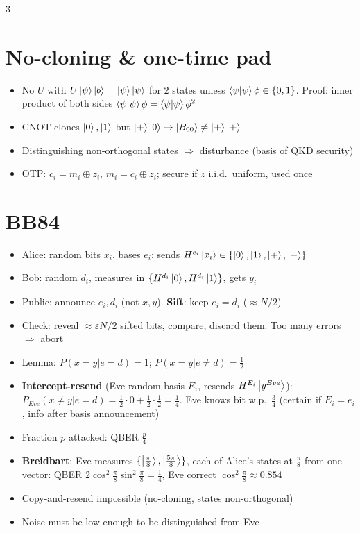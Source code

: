 \documentclass[10pt]{article}
\newcommand{\B}[1]{\ket{B_{#1}}}
\newcommand{\pp}{\ket{+}}
\newcommand{\mm}{\ket{-}}
\begin{document}
\begin{multicols*}{3}
\section{No-cloning \& one-time pad}
\begin{itemize}
  \item No $U$ with $U\ket\psi\ket{b}=\ket\psi\ket\psi$ for 2 states unless $\braket\psi\phi\in\{0,1\}$. Proof: inner product of both sides $\braket\psi\phi=\braket\psi\phi^2$
  \item CNOT clones $\ket0,\ket1$ but $\pp\ket0\mapsto\B{00}\neq\pp\pp$
  \item Distinguishing non-orthogonal states $\Rightarrow$ disturbance (basis of QKD security)
  \item OTP: $c_i=m_i\oplus z_i$, $m_i=c_i\oplus z_i$; secure if $z$ i.i.d.\ uniform, used once
\end{itemize}

\section{BB84}
\begin{itemize}
  \item Alice: random bits $x_i$, bases $e_i$; sends $H^{e_i}\ket{x_i}\in\{\ket0,\ket1,\pp,\mm\}$
  \item Bob: random $d_i$, measures in $\{H^{d_i}\ket0,H^{d_i}\ket1\}$, gets $y_i$
  \item Public: announce $e_i,d_i$ (not $x,y$). \textbf{Sift}: keep $e_i=d_i$ ($\approx N/2$)
  \item Check: reveal $\approx\varepsilon N/2$ sifted bits, compare, discard them. Too many errors $\Rightarrow$ abort
  \item Lemma: $P(x{=}y|e{=}d)=1$; $P(x{=}y|e{\ne}d)=\tfrac12$
  \item \textbf{Intercept-resend} (Eve random basis $E_i$, resends $H^{E_i}\ket{y^{Eve}}$): $P_{Eve}(x\ne y|e{=}d)=\tfrac12\cdot0+\tfrac12\cdot\tfrac12=\tfrac14$. Eve knows bit w.p.\ $\tfrac34$ (certain if $E_i=e_i$, info after basis announcement)
  \item Fraction $p$ attacked: QBER $\tfrac p4$
  \item \textbf{Breidbart}: Eve measures $\{\ket{\tfrac\pi8},\ket{\tfrac{5\pi}8}\}$, each of Alice's states at $\tfrac\pi8$ from one vector: QBER $2\cos^2\tfrac\pi8\sin^2\tfrac\pi8=\tfrac14$, Eve correct $\cos^2\tfrac\pi8\approx0.854$
  \item Copy-and-resend impossible (no-cloning, states non-orthogonal)
  \item Noise must be low enough to be distinguished from Eve
\end{itemize}


\end{multicols*}
\end{document}
